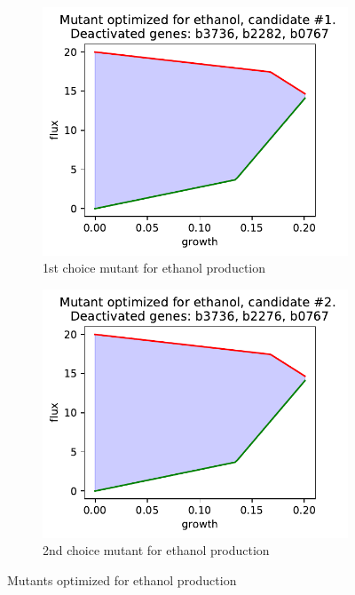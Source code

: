\documentclass{scrartcl}
\begin{document}
      
   \begin{figure}[h]
      \centering
      \begin{subfigure}{.49\textwidth}
         \centering
         \includegraphics[width=\linewidth]{q1_results/result_q1_ethanol_1.pdf}
         \caption{1st choice mutant for ethanol production}
         \label{fig:ethanol_mutant_1}
      \end{subfigure}%
      \begin{subfigure}{.49\textwidth}
         \centering
         \includegraphics[width=\linewidth]{q1_results/result_q1_ethanol_2.pdf}
         \caption{2nd choice mutant for ethanol production}
         \label{fig:ethanol_mutant_2}
      \end{subfigure}
      \caption{Mutants optimized for ethanol production}
      \label{fig:ethanol_mutants}
   \end{figure}
   
\end{document}
